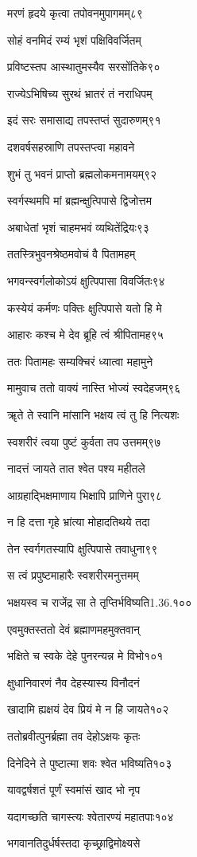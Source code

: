 मरणं हृदये कृत्वा तपोवनमुपागमम्८९

सोहं वनमिदं रम्यं भृशं पक्षिविवर्जितम्

प्रविष्टस्तप आस्थातुमस्यैव सरसोंतिके९०

राज्येऽभिषिच्य सुरथं भ्रातरं तं नराधिपम्

इदं सरः समासाद्य तपस्तप्तं सुदारुणम्९१

दशवर्षसहस्राणि तपस्तप्त्वा महावने

शुभं तु भवनं प्राप्तो ब्रह्मलोकमनामयम्९२

स्वर्गस्थमपि मां ब्रह्मन्क्षुत्पिपासे द्विजोत्तम

अबाधेतां भृशं चाहमभवं व्यथितेंद्रियः९३

ततस्त्रिभुवनश्रेष्ठमवोचं वै पितामहम्

भगवन्स्वर्गलोकोऽयं क्षुत्पिपासा विवर्जितः९४

कस्येयं कर्मणः पक्तिः क्षुत्पिपासे यतो हि मे

आहारः कश्च मे देव ब्रूहि त्वं श्रीपितामह९५

ततः पितामहः सम्यक्चिरं ध्यात्वा महामुने

मामुवाच ततो वाक्यं नास्ति भोज्यं स्वदेहजम्९६

ॠते ते स्वानि मांसानि भक्षय त्वं तु हि नित्यशः

स्वशरीरं त्वया पुष्टं कुर्वता तप उत्तमम्९७

नादत्तं जायते तात श्वेत पश्य महीतले

आग्रहाद्भिक्षमाणाय भिक्षापि प्राणिने पुरा९८

न हि दत्ता गृहे भ्रांत्या मोहादतिथये तदा

तेन स्वर्गगतस्यापि क्षुत्पिपासे तवाधुना९९

स त्वं प्रपुष्टमाहारैः स्वशरीरमनुत्तमम्

भक्षयस्व च राजेंद्र सा ते तृप्तिर्भविष्यति1.36.१००

एवमुक्तस्ततो देवं ब्रह्माणमहमुक्तवान्

भक्षिते च स्वके देहे पुनरन्यन्न मे विभो१०१

क्षुधानिवारणं नैव देहस्यास्य विनौदनं

खादामि ह्यक्षयं देव प्रियं मे न हि जायते१०२

ततोब्रवीत्पुनर्ब्रह्मा तव देहोऽक्षयः कृतः

दिनेदिने ते पुष्टात्मा शवः श्वेत भविष्यति१०३

यावद्वर्षशतं पूर्णं स्वमांसं खाद भो नृप

यदागच्छति चागस्त्यः श्वेतारण्यं महातपाः१०४

भगवानतिदुर्धर्षस्तदा कृच्छ्राद्विमोक्ष्यसे

